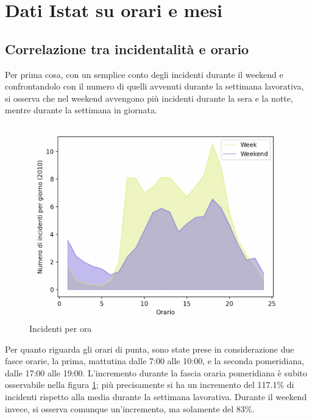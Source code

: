 \documentclass[a4paper]{report}
\begin{document}
\section{Dati Istat su orari e mesi}

\subsection{Correlazione tra incidentalità e orario}

Per prima cosa, con un semplice conto degli incidenti durante il weekend 
e confrontandolo con il numero di quelli avvenuti durante la 
settimana lavorativa, si osserva che nel weekend avvengono più incidenti 
durante la sera e la notte, mentre durante la settimana in giornata.

\begin{figure}
    \includegraphics[width=\linewidth]{../src/incidenti/incidenti_senza_coords/ore_punta/week_weekend.png}
    \caption{Incidenti per ora}
    \label{fig:week-weekend}
\end{figure}

Per quanto riguarda gli orari di punta, sono state prese in considerazione due fasce orarie, la prima, 
mattutina dalle 7:00 alle 10:00, e la seconda pomeridiana, dalle 17:00 alle 19:00.
L'incremento durante la fascia oraria pomeridiana è subito osservabile nella figura 
\ref{fig:week-weekend}; più precisamente si 
ha un incremento del 117.1\% di incidenti rispetto alla media durante la settimana lavorativa. 
Durante il weekend invece, si osserva comunque un'incremento, ma solamente del 83\%.
\end{document}
